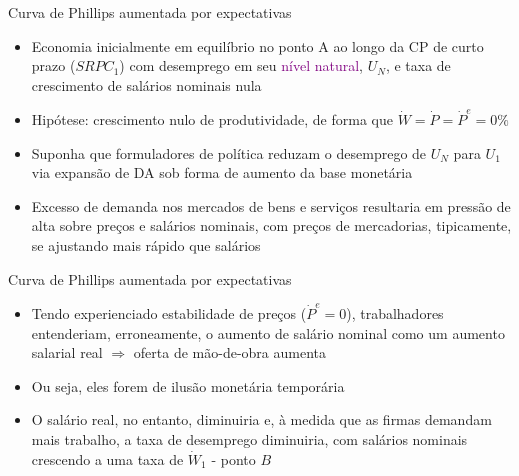 \documentclass[10pt]{beamer}
\begin{document}
\begin{frame}{Curva de Phillips aumentada por expectativas}
    \begin{itemize}
        \item Economia inicialmente em equilíbrio no ponto A ao longo da CP de curto prazo ($SRPC_1$) com desemprego em seu \textcolor{purple}{nível natural}, $U_N$, e taxa de crescimento de salários nominais nula
        \bigskip
        \item Hipótese: crescimento nulo de produtividade, de forma que $\dot{W} = \dot{P} = \dot{P}^e = 0\%$
        \bigskip
        \item Suponha que formuladores de política reduzam o desemprego de $U_N$ para $U_1$ via expansão de DA sob forma de aumento da base monetária
        \bigskip
        \item Excesso de demanda nos mercados de bens e serviços resultaria em pressão de alta sobre preços e salários nominais, com preços de mercadorias, tipicamente, se ajustando mais rápido que salários
    \end{itemize}    
\end{frame}

\begin{frame}{Curva de Phillips aumentada por expectativas}
    \begin{itemize}
        \item Tendo experienciado estabilidade de preços ($\dot{P}^e = 0$), trabalhadores entenderiam, erroneamente, o aumento de salário nominal como um aumento salarial real $\Rightarrow$ oferta de mão-de-obra aumenta
        \bigskip
        \item Ou seja, eles forem de ilusão monetária temporária
        \bigskip
        \item O salário real, no entanto, diminuiria e, à medida que as firmas demandam mais trabalho, a taxa de desemprego diminuiria, com salários nominais crescendo a uma taxa de $\dot{W}_1$ - ponto $B$
    \end{itemize}    
\end{frame}
\end{document}
